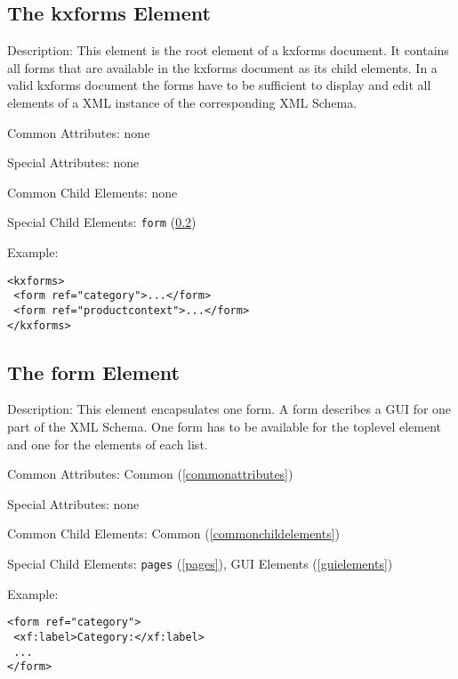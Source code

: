 \subsection{ The kxforms Element}
\begin{description}
 \item Description:  This element is the root element of a kxforms document. It contains all forms that are available in the kxforms document as its child elements. In a valid kxforms document the forms have to be sufficient to display and edit all elements of a XML instance of the corresponding XML Schema.

 \item Common Attributes: none

 \item Special Attributes: none

 \item Common Child Elements: none

 \item Special Child Elements: \texttt{form} (\ref{formelement})

 \item Example:
\begin{lstlisting}[caption=kxforms Element]
<kxforms>
 <form ref="category">...</form>
 <form ref="productcontext">...</form>
</kxforms>
\end{lstlisting}
\end{description}




\subsection{ The form Element}
\label{formelement}
\begin{description}
 \item Description: This element encapsulates one form. A form describes a GUI for one part of the XML Schema. One form has to be available for the toplevel element and one for the elements of each list.

 \item Common Attributes: Common (\ref{commonattributes})

 \item Special Attributes: none

 \item Common Child Elements: Common (\ref{commonchildelements})

 \item Special Child Elements: \texttt{pages} (\ref{pages}), GUI Elements (\ref{guielements})

 \item Example:
\begin{lstlisting}[caption=form Element]
<form ref="category">
 <xf:label>Category:</xf:label>
 ...
</form>
\end{lstlisting}
\end{description}





\pagebreak
